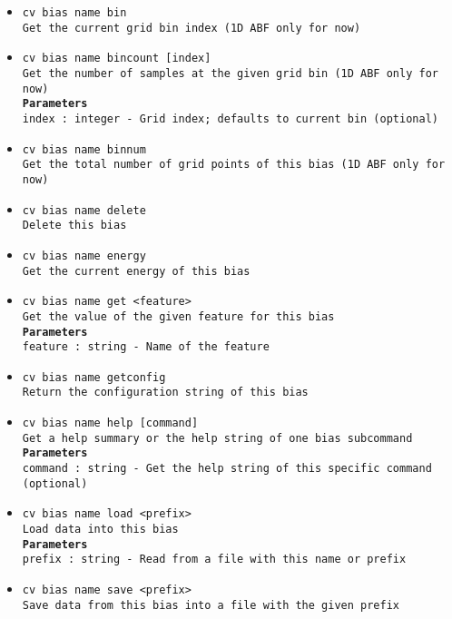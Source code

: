 \begin{itemize}
\item \texttt{cv bias name bin}
\\
\texttt{Get the current grid bin index (1D ABF only for now)}
\item \texttt{cv bias name bincount [index]}
\\
\texttt{Get the number of samples at the given grid bin (1D ABF only for now)}
\\
\texttt{\textbf{Parameters}}
\\
\texttt{index : integer - Grid index; defaults to current bin (optional)}
\item \texttt{cv bias name binnum}
\\
\texttt{Get the total number of grid points of this bias (1D ABF only for now)}
\item \texttt{cv bias name delete}
\\
\texttt{Delete this bias}
\item \texttt{cv bias name energy}
\\
\texttt{Get the current energy of this bias}
\item \texttt{cv bias name get <feature>}
\\
\texttt{Get the value of the given feature for this bias}
\\
\texttt{\textbf{Parameters}}
\\
\texttt{feature : string - Name of the feature}
\item \texttt{cv bias name getconfig}
\\
\texttt{Return the configuration string of this bias}
\item \texttt{cv bias name help [command]}
\\
\texttt{Get a help summary or the help string of one bias subcommand}
\\
\texttt{\textbf{Parameters}}
\\
\texttt{command : string - Get the help string of this specific command (optional)}
\item \texttt{cv bias name load <prefix>}
\\
\texttt{Load data into this bias}
\\
\texttt{\textbf{Parameters}}
\\
\texttt{prefix : string - Read from a file with this name or prefix}
\item \texttt{cv bias name save <prefix>}
\\
\texttt{Save data from this bias into a file with the given prefix}
\\

\end{itemize}
